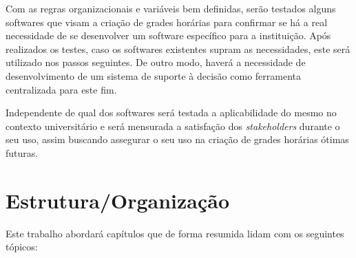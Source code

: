 


    Com as regras organizacionais e variáveis bem definidas, serão testados alguns softwares que visam a criação de grades horárias para confirmar se há a real necessidade de se desenvolver um software específico para a instituição. Após realizados os testes, caso os softwares existentes supram as necessidades, este será utilizado nos passos seguintes. De outro modo, haverá a necessidade de desenvolvimento de um sistema de suporte à decisão como ferramenta centralizada para este fim.

    Independente de qual dos softwares será testada a aplicabilidade do mesmo no contexto universitário e será mensurada a satisfação dos \textit{stakeholders} durante o seu uso, assim buscando assegurar o seu uso na criação de grades horárias ótimas futuras.

\section{Estrutura/Organização} %

    Este trabalho abordará capítulos que de forma resumida lidam com os seguintes tópicos:

